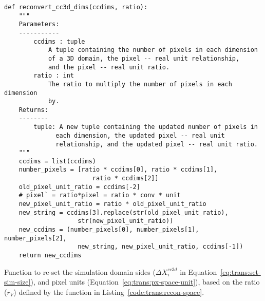 \begin{listing}[H]%
\begin{verbatim}
def reconvert_cc3d_dims(ccdims, ratio):
    """
    Parameters:
    -----------
        ccdims : tuple
            A tuple containing the number of pixels in each dimension 
            of a 3D domain, the pixel -- real unit relationship,
            and the pixel -- real unit ratio.
        ratio : int
            The ratio to multiply the number of pixels in each dimension 
            by.
    Returns:
    --------
        tuple: A new tuple containing the updated number of pixels in 
              each dimension, the updated pixel -- real unit 
              relationship, and the updated pixel -- real unit ratio.
    """
    ccdims = list(ccdims)
    number_pixels = [ratio * ccdims[0], ratio * ccdims[1], 
                        ratio * ccdims[2]]
    old_pixel_unit_ratio = ccdims[-2]
    # pixel` = ratio*pixel = ratio * conv * unit
    new_pixel_unit_ratio = ratio * old_pixel_unit_ratio
    new_string = ccdims[3].replace(str(old_pixel_unit_ratio), 
                    str(new_pixel_unit_ratio))
    new_ccdims = (number_pixels[0], number_pixels[1], number_pixels[2], 
                    new_string, new_pixel_unit_ratio, ccdims[-1])
    return new_ccdims
\end{verbatim}
\caption{Function to re-set the simulation domain sides ($\Delta X^{cc3d}_i$ in Equation~\ref{eq:trans:set-sim-size}), and pixel units (Equation~\ref{eq:trans:px-space-unit}), based on the ratio ($r_V$) defined by the function in Listing~\ref{code:trans:recon-space}.}\label{code:trans:recon-space:dims}
\end{listing}

